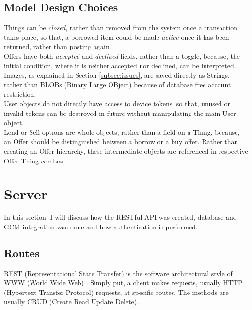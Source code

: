 \subsection{Model Design Choices}

Things can be \textit{closed}, rather than removed from the system once a transaction takes place, so that, a borrowed item could be made \textit{active} once it has been returned, rather than posting again.\\

Offers have both \textit{accepted} and \textit{declined} fields, rather than a toggle, because, the initial condition, where it is neither accepted nor declined, can be interpreted.\\

Images, as explained in Section \ref{subsec:issues}, are saved directly as Strings, rather than BLOBs (Binary Large OBject) because of database free account restriction.\\

User objects do not directly have access to device tokens, so that, unused or invalid tokens can be destroyed in future without manipulating the main User object.\\

Lend or Sell options are whole objects, rather than a field on a Thing, because, an Offer should be distinguished between a borrow or a buy offer. Rather than creating an Offer hierarchy, these intermediate objects are referenced in respective Offer-Thing combos.

\section{Server}

In this section, I will discuss how the RESTful API was created, database and GCM integration was done and how authentication is performed.

\subsection{Routes}

\href{https://en.wikipedia.org/wiki/Representational_state_transfer}{REST} (Representational State Transfer) is the software architectural style of WWW (World Wide Web) \cite{Fielding:2000}. Simply put, a client makes requests, usually HTTP (Hypertext Transfer Protocol) requests, at specific routes. The methods are usually CRUD (Create Read Update Delete).\\

